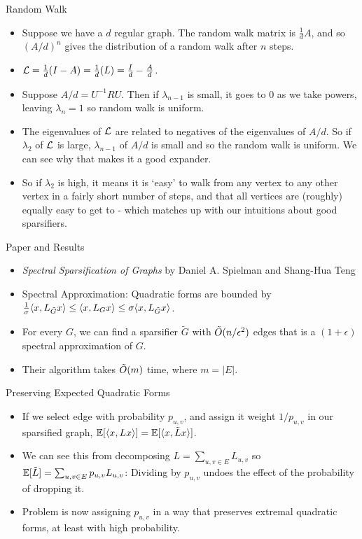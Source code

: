 \documentclass[presentation]{beamer}
\begin{document}
\begin{frame}[label={sec:org04ef2bf}]{Random Walk}
\begin{itemize}
\item Suppose we have a \(d\) regular graph. The random walk matrix is \(\frac{1}{d}A\), and so \((A/d)^n\) gives the distribution of a random walk after \(n\) steps.
\item \(\mathcal{L}=\frac{1}{d}(I-A)=\frac{1}{d}(L)=\frac{I}{d}-\frac{A}{d}\).
\item Suppose \(A/d=U^{-1}RU\). Then if \(\lambda_{n-1}\) is small, it goes to \(0\) as we take powers, leaving \(\lambda_n=1\) so random walk is uniform.
\item The eigenvalues of \(\mathcal{L}\) are related to negatives of the eigenvalues of \(A/d\). So if \(\lambda_2\) of \(\mathcal{L}\) is large, \(\lambda_{n-1}\) of \(A/d\) is small and so the random walk is uniform. We can see why that makes it a good expander.
\item So if \(\lambda_2\) is high, it means it is `easy' to walk from any vertex to any other vertex in a fairly short number of steps, and that all vertices are (roughly) equally easy to get to - which matches up with our intuitions about good sparsifiers.
\end{itemize}
\end{frame}
\begin{frame}[label={sec:org817c3fe}]{Paper and Results}
\begin{itemize}
\item \emph{Spectral Sparsification of Graphs} by Daniel A. Spielman and Shang-Hua Teng
\item Spectral Approximation: Quadratic forms are bounded by \(\frac{1}{\sigma}\langle x , L_{\tilde{G}}x \rangle \le \langle x , L_Gx \rangle \le \sigma\langle x , L_{\tilde{G}}x \rangle\).
\item For every \(G\), we can find a sparsifier \(\tilde{G}\) with \(\tilde{O}(n/\epsilon^2)\) edges that is a \((1+\epsilon)\) spectral approximation of \(G\).
\item Their algorithm takes \(\tilde{O}(m)\) time, where \(m=|E|\).
\end{itemize}
\end{frame}
\begin{frame}[label={sec:org5373ec5}]{Preserving Expected Quadratic Forms}
\begin{itemize}
\item If we select edge with probability \(p_{u,v}\), and assign it weight \(1/p_{u,v}\) in our sparsified graph, \(\mathbb{E}[\langle x , Lx \rangle]=\mathbb{E}[\langle x , \tilde{L}x \rangle]\).
\item We can see this from decomposing \(L=\sum_{u,v \in E}L_{u,v}\) so \(\mathbb{E}[\tilde{L}]=\sum_{u,v \in E}p_{u,v}L_{u,v}\): Dividing by \(p_{u,v}\) undoes the effect of the probability of dropping it.
\item Problem is now assigning \(p_{u,v}\) in a way that preserves extremal quadratic forms, at least with high probability.
\end{itemize}
\end{frame}
\end{document}
